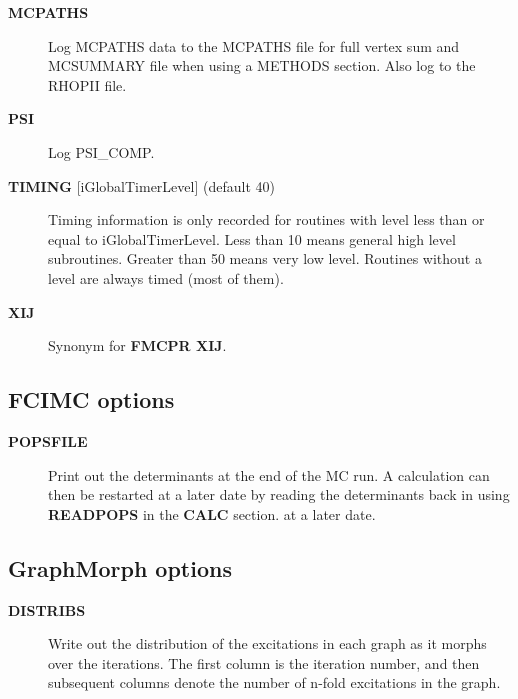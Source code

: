 \documentclass[openany,a4paper,10pt]{manual}
\begin{document}
\begin{description}
\item[\textbf{MCPATHS}]
Log MCPATHS data to the MCPATHS file for full vertex sum and MCSUMMARY
file when using a METHODS section.  Also log to the RHOPII file.

\item[\textbf{PSI}]
Log PSI\_COMP.

\item[\textbf{TIMING} {[}iGlobalTimerLevel{]} (default 40)]
Timing information is only recorded for routines with level less than
or equal to iGlobalTimerLevel.  Less than 10 means general high level
subroutines. Greater than 50 means very low level.  Routines without
a level are always timed (most of them).

\item[\textbf{XIJ}]
Synonym for \textbf{FMCPR XIJ}.

\end{description}


\subsection{FCIMC options}
\begin{description}
\item[\textbf{POPSFILE}]
Print out the determinants at the end of the MC run. A calculation
can then be restarted at a later date by reading the determinants
back in using \textbf{READPOPS} in the \textbf{CALC} section.
at a later date.

\end{description}


\subsection{GraphMorph options}
\begin{description}
\item[\textbf{DISTRIBS}]
Write out the distribution of the excitations in each graph as it
morphs over the iterations. The first column is the iteration number, and
then subsequent columns denote the number of n-fold excitations in
the graph.

\end{description}
\end{document}
